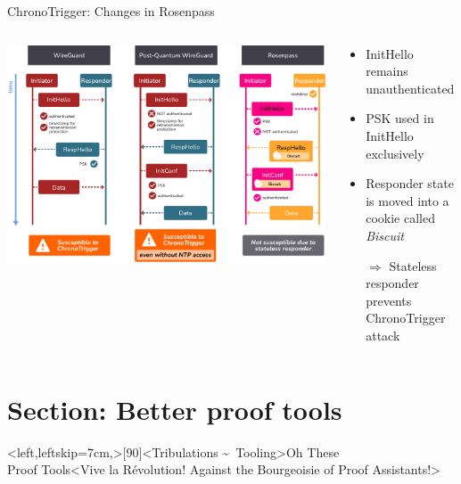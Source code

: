 \begin{frame}{ChronoTrigger: Changes in Rosenpass}
  \begin{columns}[fullwidth,c]
    \begin{column}{.64\linewidth}
      \includegraphics[keepaspectratio,width=\linewidth]{graphics/chronotrigger-compare.pdf}
    \end{column}%
    \begin{column}{.3\linewidth}
      \begin{itemize}
        \item InitHello remains unauthenticated
        \item PSK used in InitHello exclusively
        \item Responder state is moved into a cookie called \emph{Biscuit}
        \item[$\Rightarrow$] Stateless responder prevents ChronoTrigger attack
      \end{itemize}
    \end{column}
  \end{columns}
\end{frame}

\hypertarget{section-better-proof-tools}{%
\section{Section: Better proof tools}\label{section-better-proof-tools}}

\interlude*<left,leftskip=7cm,>[90]<Tribulations \textasciitilde\ Tooling>{Oh These\\Proof Tools}<Vive la Révolution! Against the Bourgeoisie of Proof Assistants!>

